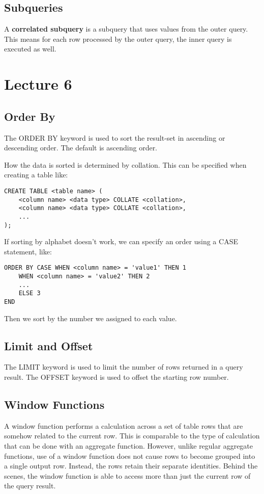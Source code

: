 \documentclass[a4paper,12pt]{article}
\begin{document}
\subsection{Subqueries}

A \textbf{correlated subquery} is a subquery that uses values from the outer query.
This means for each row processed by the outer query, the inner query is executed as well.

\section{Lecture 6}

\subsection{Order By}

The ORDER BY keyword is used to sort the result-set in ascending or descending order.
The default is ascending order.

How the data is sorted is determined by collation.
This can be specified when creating a table like:
\begin{verbatim}
CREATE TABLE <table name> (
	<column name> <data type> COLLATE <collation>,
	<column name> <data type> COLLATE <collation>,
	...
);
\end{verbatim}

If sorting by alphabet doesn't work, we can specify an order using a CASE statement, like:
\begin{verbatim}
ORDER BY CASE WHEN <column name> = 'value1' THEN 1
	WHEN <column name> = 'value2' THEN 2
	...
	ELSE 3
END
\end{verbatim}
Then we sort by the number we assigned to each value.

\subsection{Limit and Offset}

The LIMIT keyword is used to limit the number of rows returned in a query result.
The OFFSET keyword is used to offset the starting row number.

\subsection{Window Functions}

A window function performs a calculation across a set of table rows that are somehow related to the current row.
This is comparable to the type of calculation that can be done with an aggregate function.
However, unlike regular aggregate functions, use of a window function does not cause rows to become grouped into a single output row.
Instead, the rows retain their separate identities.
Behind the scenes, the window function is able to access more than just the current row of the query result.
\end{document}

